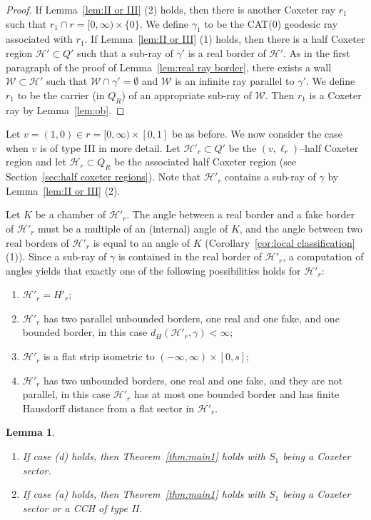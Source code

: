 \documentclass[11pt]{amsart}
\newcommand {\h}{\mathcal H}
\newcommand {\W}{\mathcal W}
\newtheorem{lemma}[theorem]{Lemma}
\theoremstyle{definition}
\begin{document}
\begin{proof}
	If Lemma~\ref{lem:II or III} (2) holds, then there is another Coxeter ray $r_1$ such that $r_1\cap r=[0,\infty)\times\{0\}$. We define $\gamma_1$ to be the CAT(0) geodesic ray associated with $r_1$. If Lemma~\ref{lem:II or III} (1) holds, then there is a half Coxeter region $\h'\subset Q'$ such that a sub-ray of $\gamma'$ is a real border of $\h'$. As in the first paragraph of the proof of Lemma~\ref{lem:real ray border}, there exists a wall $\W\subset\h'$ such that $\W\cap \gamma'=\emptyset$ and $\W$ is an infinite ray parallel to $\gamma'$. We define $r_1$ to be the carrier (in $Q_R$) of an appropriate sub-ray of $\W$. Then $r_1$ is a Coxeter ray by Lemma~\ref{lem:ob}.
\end{proof}

Let $v=(1,0)\in r=[0,\infty)\times[0,1]$ be as before. We now consider the case when $v$ is of type III in more detail. Let $\h'_r\subset Q'$ be the $(v,\ell_r)$--half Coxeter region and let $\h_r\subset Q_R$ be the associated half Coxeter region (see Section~\ref{sec:half coxeter regions}). Note that $\h'_r$ contains a sub-ray of $\gamma$ by Lemma~\ref{lem:II or III} (2).

Let $K$ be a chamber of $\h'_r$. The angle between a real border and a fake border of $\h'_r$ must be a multiple of an (internal) angle of $K$, and the angle between two real borders of $\h'_r$ is equal to an angle of $K$ (Corollary~\ref{cor:local classification} (1)). Since a sub-ray of $\gamma$ is contained in the real border of $\h'_r$, a computation of angles yields that exactly one of the following possibilities holds for $\h'_r$:
\begin{enumerate}[label=(\alph*)]
	\item $\h'_r= H'_r$;
	\item $\h'_r$ has two parallel unbounded borders, one real and one fake, and one bounded border, in this case $d_H(\h'_r,\gamma)<\infty$;
	\item $\h'_r$ is a flat strip isometric to $(-\infty,\infty)\times[0,s]$;
	\item $\h'_r$ has two unbounded borders, one real and one fake, and they are not parallel, in this case $\h'_r$ has at most one bounded border and has finite Hausdorff distance from a flat sector in $\h'_r$.
\end{enumerate}

\begin{lemma}\
	\label{lem:case a and c}
	\begin{enumerate}
		\item If case (d) holds, then Theorem~\ref{thm:main1} holds with $S_1$ being a Coxeter sector.
		\item If case (a) holds, then Theorem~\ref{thm:main1} holds with $S_1$ being a Coxeter sector or a CCH of type II.
	\end{enumerate}
\end{lemma}
\end{document}
